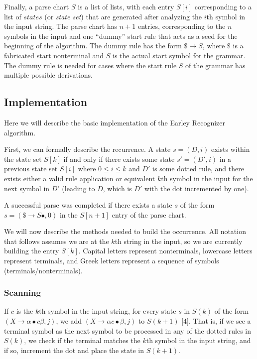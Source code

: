 \documentclass[a4paper, 11pt]{article}
\begin{document}
Finally, a parse chart $S$ is a list of lists, with each entry $S[i]$ corresponding to a list of $states$ (or \textit{state set}) that are generated after analyzing the $i$th symbol in the input 
string. The parse chart has $n+1$ entries, corresponding to the $n$ symbols in the input and one ``dummy'' start rule that acts as a seed for the beginning of the algorithm.
The dummy rule has the form $\$ \to S$, where $\$$ is a fabricated start nonterminal and $S$ is the actual start symbol for the grammar. The dummy rule is needed for cases
where the start rule $S$ of the grammar has multiple possible derivations.

\subsection{Implementation}
Here we will describe the basic implementation of the Earley Recognizer algorithm. 

First, we can formally describe the recurrence. A state $s=(D,i)$ exists within the state set $S[k]$ if and only if there exists some state $s' = (D', i)$ in a previous
state set $S[i]$ where $0 \le i \le k$ and $D'$ is some dotted rule, and there exists either a valid rule application or equivalent
$k$th symbol in the input for the next symbol in $D'$ (leading to $D$, which is $D'$ with the dot incremented by one).

\begin{center}  \end{center}

A successful parse was completed if there exists a state $s$ of the form $s=(\$ \to S \bullet, 0)$ in the $S[n+1]$ entry of the parse chart.

We will now describe the methods needed to build the occurrence. All notation that follows assumes we are at the $k$th string in the input, so we are currently building 
the entry $S[k]$. Capital letters represent nonterminals, lowercase letters represent terminals, and Greek letters represent a sequence of symbols (terminals/nonterminals).

\subsubsection{Scanning}
If $c$ is the $k$th symbol in the input string, for every state $s$ in $S(k)$ of the form $(X \to \alpha \bullet c \beta, j)$, we add $(X \to \alpha c \bullet \beta, j)$
to $S(k+1)$ [4]. That is, if we see a terminal symbol as the next symbol to be processed in any of the dotted rules in $S(k)$, we check if the terminal matches the 
$k$th symbol in the input string, and if so, increment the dot and place the state in $S(k+1)$.
\end{document}
